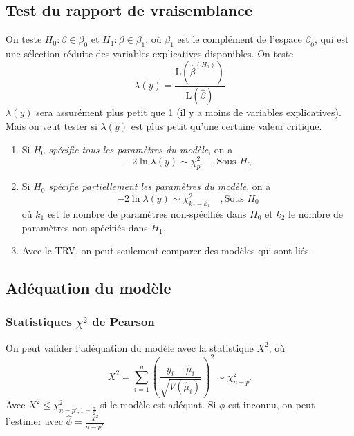 \documentclass[10pt, french]{article}
\begin{document}
\begin{multicols*}{3}
\subsection*{Test du rapport de vraisemblance}
On teste $H_0 : \beta \in \beta_0$ et $H_1 : \beta \in \beta_1$, où $\beta_1$ est le complément de l'espace $\beta_0$, qui est une sélection réduite des variables explicatives disponibles. On teste
\[\lambda(y) = \frac{\mathrm{L}\left(\hat{\beta}^{(H_0)} \right)}{\mathrm{L}(\hat{\beta})}   \]
$\lambda(y)$ sera assurément plus petit que 1 (il y a moins de variables explicatives). Mais on veut tester si $\lambda(y)$ est plus petit qu'une certaine valeur critique.

\begin{enumerate}[label=\faAngleRight]
\item Si \emph{$H_0$ spécifie tous les paramètres du modèle}, on a
\[-2 \ln \lambda(y) \sim \chi_{p'}^2 \quad , \text{Sous $H_0$}\]
\item Si \emph{$H_0$ spécifie partiellement les paramètres du modèle}, on a
\[-2 \ln \lambda(y) \sim \chi_{k_2 - k_1}^2 \quad , \text{Sous $H_0$}\]
où $k_1$ est le nombre de paramètres non-spécifiés dans $H_0$ et $k_2$ le nombre de paramètres non-spécifiés dans $H_1$.
\item Avec le TRV, on peut seulement comparer des modèles qui sont liés.
\end{enumerate}

\subsection*{Adéquation du modèle}

\subsubsection*{Statistiques $\chi^2$ de Pearson}
On peut valider l'adéquation du modèle avec la statistique $X^2$, où
\[  X^2 = \sum_{i=1}^{n} \left( \frac{y_i -  \hat{\mu}_i}{\sqrt{V(\hat{\mu}_i)}} \right)^2   \sim \chi_{n-p'}^2 \]
Avec $X^2 \leq \chi_{n-p', 1 - \frac{\alpha}{2}}^2$ si le modèle est adéquat. Si $\phi$ est inconnu, on peut l'estimer avec $\hat{\phi} = \frac{X^2}{n-p'}$


\end{multicols*}
\end{document}
